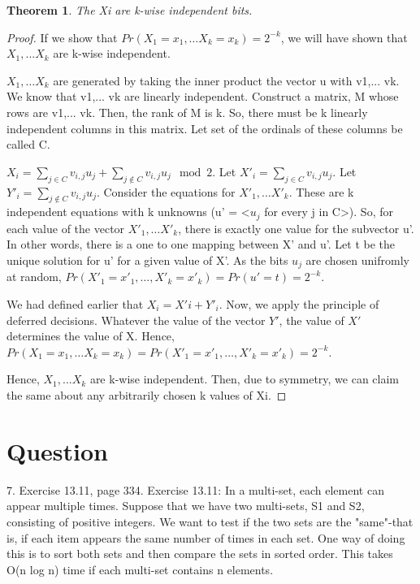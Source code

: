 \documentclass[10pt]{amsart}
\newtheorem{thm}{Theorem}[subsection]
\theoremstyle{remark}
\begin{document}
\begin{thm}
The Xi are k-wise independent bits.
\end{thm}
\begin{proof}
If we show that $Pr(X_{1}=x_{1}, \dots X_{k}=x_{k}) = 2^{-k}$, we will have shown that $X_{1}, ... X_{k}$ are k-wise independent.

$X_{1}, \dots X_{k}$ are generated by taking the inner product the vector u with v1,... vk. We know that v1,... vk are linearly independent. Construct a matrix, M whose rows are v1,... vk. Then, the rank of M is k. So, there must be k linearly independent columns in this matrix. Let set of the ordinals of these columns be called C.

$X_{i}=\sum_{j \in C}v_{i,j}u_{j} + \sum_{j \notin C}v_{i,j}u_{j}\mod 2$. Let $X'_{i}= \sum_{j \in C}v_{i,j}u_{j}$. Let $Y'_{i}= \sum_{j \notin C}v_{i,j}u_{j}$. Consider the equations for $X'_{1}, \dots X'_{k}$. These are k independent equations with k unknowns (u' = <$u_{j}$ for every j in C>). So, for each value of the vector $X'_{1}, \dots X'_{k}$, there is exactly one value for the subvector u'. In other words, there is a one to one mapping between X' and u'. Let t be the unique solution for u' for a given value of X'. As the bits $u_{j}$ are chosen unifromly at random, $Pr(X'_{1}=x'_{1}, \dots ,X'_{k}=x'_{k})= Pr(u'=t) = 2^{-k}$.

We had defined earlier that $X_{i}= X'{i} + Y'_{i}$. Now, we apply the principle of deferred decisions. Whatever the value of the vector $Y'$, the value of $X'$ determines the value of X. Hence, $Pr(X_{1}=x_{1}, \dots X_{k}=x_{k}) = Pr(X'_{1}=x'_{1}, \dots ,X'_{k}=x'_{k}) = 2^{-k}$.

Hence, $X_{1}, ... X_{k}$ are k-wise independent. Then, due to symmetry, we can claim the same about any arbitrarily chosen k values of Xi.
\end{proof}

\section{Question}
7. Exercise 13.11, page 334. Exercise 13.11: In a multi-set, each element can appear multiple times. Suppose that we have two multi-sets, S1 and S2, consisting of positive integers. We want to test if the two sets are the "same"-that is, if each item appears the same number of times in each set. One way of doing this is to sort both sets and then compare the sets in sorted order. This takes O(n log n) time if each multi-set contains n elements.
\end{document}

